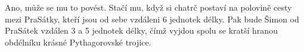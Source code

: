 \documentclass{fkssolpub}
\author{Ondřej Sedláček}
\begin{document}
Ano, může se mu to povést. Stačí mu, když si chatrč postaví na polovině
cesty mezi PraSátky, kteří jsou od sebe vzdáleni 6 jednotek délky. Pak
bude Šimon od PraSátek vzdálen 3 a 5 jednotek délky, čímž vyjdou spolu se
kratší hranou obdélníku krásné Pythagorovské trojice.
\end{document}
